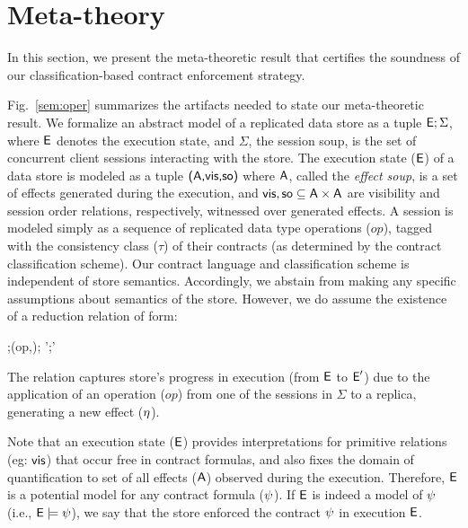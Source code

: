 \section{Meta-theory}
\label{sec:core-opsem}

In this section, we present the meta-theoretic result that certifies
the soundness of our classification-based contract enforcement
strategy.

Fig.~\ref{sem:oper} summarizes the artifacts needed to state our
meta-theoretic result. We formalize an abstract model of a replicated
data store as a tuple ${\normalfont \textsf{E}};\Sigma$, where ${\normalfont \textsf{E}}$ denotes the execution
state, and $\Sigma$, the session soup, is the set of concurrent client
sessions interacting with the store. The execution state (${\normalfont \textsf{E}}$) of a
data store is modeled as a tuple ${\normalfont \textsf{({\normalfont \textsf{A}},\allowbreak {\normalfont \textsf{vis}},\allowbreak {\normalfont \textsf{so}})}}$ where ${\normalfont \textsf{A}}$, called the
\emph{effect soup}, is a set of effects generated during the
execution, and ${\normalfont \textsf{vis}},{\normalfont \textsf{so}} \subseteq {\normalfont \textsf{A}} \times {\normalfont \textsf{A}}$ are
visibility and session order relations, respectively, witnessed over
generated effects. A session is modeled simply as a sequence of
replicated data type operations ($op$), tagged with the consistency
class ($\tau$) of their contracts (as determined by the contract
classification scheme). Our contract language and classification
scheme is independent of store semantics. Accordingly, we abstain from
making any specific assumptions about semantics of the store. However,
we do assume the existence of a reduction relation of form:

\begin{smathpar}
  \auxred{} {\E;\langle (op,\tau);\sigma \rangle \pll \Sigma} {\eff} 
    {\E';\langle \sigma \rangle \pll \Sigma'}
\end{smathpar}

\noindent The relation captures store's progress in execution (from
${\normalfont \textsf{E}}$ to ${\normalfont \textsf{E}}'$) due to the application of an operation ($op$) from one
of the sessions in $\Sigma$ to a replica, generating a new effect
($\eta$).

Note that an execution state (${\normalfont \textsf{E}}$) provides interpretations for
primitive relations (eg: ${\normalfont \textsf{vis}}$) that occur free in contract
formulas, and also fixes the domain of quantification to set of all
effects (${\normalfont \textsf{A}}$) observed during the execution. Therefore, ${\normalfont \textsf{E}}$ is
a potential model for any contract formula ($\psi$). If ${\normalfont \textsf{E}}$ is indeed
a model of $\psi$ (i.e., ${\normalfont \textsf{E}} \models \psi$), we say that the store
enforced the contract $\psi$ in execution ${\normalfont \textsf{E}}$.

